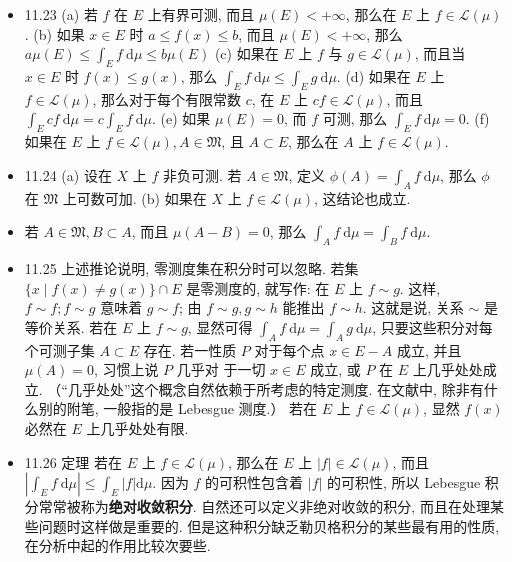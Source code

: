 \begin{itemize}
\item 11.23 (a) 若 $f$ 在 $E$ 上有界可测, 而且 $\mu(E)<+\infty$, 那么在 $E$ 上 $f \in \mathscr{L}(\mu)$. (b) 如果 $x \in E$ 时 $a \leqslant f(x) \leqslant b$, 而且 $\mu(E)<+\infty$, 那么 $a \mu(E) \leqslant \int_{E} f \mathrm{~d} \mu \leqslant b \mu(E)$ (c) 如果在 $E$ 上 $f$ 与 $g \in \mathscr{L}(\mu)$, 而且当 $x \in E$ 时 $f(x) \leqslant g(x)$, 那么 $\int_{E} f \mathrm{~d} \mu \leqslant \int_{E} g \mathrm{~d} \mu$. (d) 如果在 $E$ 上 $f \in \mathscr{L}(\mu)$, 那么对于每个有限常数 $c$, 在 $E$ 上 $c f \in \mathscr{L}(\mu)$, 而且 $\int_{E} c f \mathrm{~d} \mu=c \int_{E} f \mathrm{~d} \mu$. (e) 如果 $\mu(E)=0$, 而 $f$ 可测, 那么 $\int_{E} f \mathrm{~d} \mu=0$. (f) 如果在 $E$ 上 $f \in \mathscr{L}(\mu), A \in \mathfrak{M}$, 且 $A \subset E$, 那么在 $A$ 上 $f \in \mathscr{L}(\mu)$.

\item 11.24 (a) 设在 $X$ 上 $f$ 非负可测. 若 $A \in \mathfrak{M}$, 定义 $\phi(A)=\int_{A} f \mathrm{~d} \mu$, 那么 $\phi$ 在 $\mathfrak{M}$ 上可数可加. (b) 如果在 $X$ 上 $f \in \mathscr{L}(\mu)$, 这结论也成立.

\item 若 $A \in \mathfrak{M}, B \subset A$, 而且 $\mu(A-B)=0$, 那么 $\int_{A} f \mathrm{~d} \mu=\int_{B} f \mathrm{~d} \mu$.

\item 11.25 上述推论说明, 零测度集在积分时可以忽略. 若集 $\{x \mid f(x) \neq g(x)\} \cap E$ 是零测度的, 就写作: 在 $E$ 上 $f \sim g$. 这样, $f \sim f ; f \sim g$ 意味着 $g \sim f$; 由 $f \sim g, g \sim h$ 能推出 $f \sim h$. 这就是说, 关系 $\sim$ 是等价关系. 若在 $E$ 上 $f \sim g$, 显然可得 $\int_{A} f \mathrm{~d} \mu=\int_{A} g \mathrm{~d} \mu$, 只要这些积分对每个可测子集 $A \subset E$ 存在. 若一性质 $P$ 对于每个点 $x \in E-A$ 成立, 并且 $\mu(A)=0$, 习惯上说 $P$ 几乎对 于一切 $x \in E$ 成立, 或 $P$ 在 $E$ 上几乎处处成立. （“几乎处处”这个概念自然依赖于所考虑的特定测度. 在文献中, 除非有什么别的附笔, 一般指的是 Lebesgue 测度.） 若在 $E$ 上 $f \in \mathscr{L}(\mu)$, 显然 $f(x)$ 必然在 $E$ 上几乎处处有限.

\item 11.26 定理 若在 $E$ 上 $f \in \mathscr{L}(\mu)$, 那么在 $E$ 上 $|f| \in \mathscr{L}(\mu)$, 而且 $\left|\int_{E} f \mathrm{~d} \mu\right| \leqslant \int_{E}|f| \mathrm{d} \mu$. 因为 $f$ 的可积性包含着 $|f|$ 的可积性, 所以 Lebesgue 积分常常被称为\textbf{绝对收敛积分}. 自然还可以定义非绝对收敛的积分, 而且在处理某些问题时这样做是重要的. 但是这种积分缺乏勒贝格积分的某些最有用的性质, 在分析中起的作用比较次要些.


\end{itemize}
